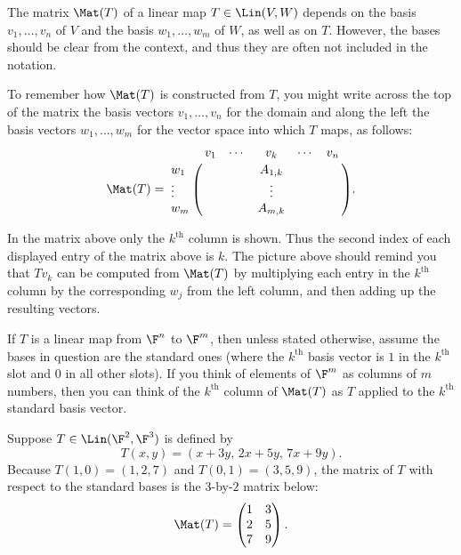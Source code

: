 The matrix $\Mat(T)$ of a linear map $T\in\Lin(V,W)$ depends on the basis
$v_1,\dots,v_n$ of $V$ and the basis $w_1,\dots,w_m$ of $W$, as well as on $T$.
However, the bases should be clear from the context, and thus they are often
not included in the notation.

To remember how $\Mat(T)$ is constructed from $T$, you might write across the
top of the matrix the basis vectors $v_1,\dots,v_n$ for the domain and along
the left the basis vectors $w_1,\dots,w_m$ for the vector space into which $T$
maps, as follows:
\[ \Mat(T) = \bordermatrix{
      & v_1 & \cdots & v_k & \cdots & v_n \cr
  w_1 &     &        & A_{1,k} &    &     \cr
  \vdots &  &        & \vdots  &    &     \cr
  w_m &     &        & A_{m,k} &    &     \cr}. \]

%
In the matrix above only the $k^{\text{th}}$ column is shown. Thus the second
index of each displayed entry of the matrix above is $k$. The picture above
should remind you that $Tv_k$ can be computed from $\Mat(T)$ by multiplying
each entry in the $k^{\text{th}}$ column by the corresponding $w_j$ from the
left column, and then adding up the resulting vectors.

%
If $T$ is a linear map from $\F^n$ to $\F^m$, then unless stated otherwise,
assume the bases in question are the standard ones (where the
$k^{\text{th}}$ basis vector is $1$ in the $k^{\text{th}}$ slot and $0$ in all
other slots). If you think of elements of $\F^m$ as columns of $m$ numbers,
then you can think of the $k^{\text{th}}$ column of $\Mat(T)$ as $T$ applied
to the $k^{\text{th}}$ standard basis vector.

\begin{example}\label{ax:3.32}
Suppose $T\in\Lin(\F^2,\F^3)$ is defined by
\[ T(x,y) = (x+3y,\,2x+5y,\,7x+9y). \]
Because $T(1,0)=(1,2,7)$ and $T(0,1)=(3,5,9)$, the matrix of $T$ with respect
to the standard bases is the $3$-by-$2$ matrix below:
\[ \Mat(T) = \begin{pmatrix} 1 & 3\\ 2 & 5\\ 7 & 9 \end{pmatrix}. \]
\end{example}

